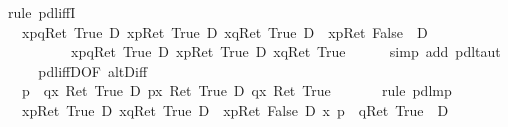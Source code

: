 \begin{isabellebody}
\isamarkupfalse%
\ {\isacharparenleft}rule\ pdl{\isacharunderscore}iffI{\isacharparenright}\isanewline
\ \ \isamarkupfalse%
\ {\isachardoublequote}{\isasymturnstile}\ {\isacharparenleft}\ {\isasymlangle}x{\isasymleftarrow}p{\isasymparallel}q{\isasymrangle}{\isacharparenleft}Ret\ True{\isacharparenright}\ {\isasymlongrightarrow}\isactrlsub D\ {\isasymlangle}x{\isasymleftarrow}p{\isasymrangle}{\isacharparenleft}Ret\ True{\isacharparenright}\ {\isasymor}\isactrlsub D\ {\isasymlangle}x{\isasymleftarrow}q{\isasymrangle}{\isacharparenleft}Ret\ True{\isacharparenright}\ {\isasymand}\isactrlsub D\ {\isacharbrackleft}{\isacharhash}\ x{\isasymleftarrow}p{\isacharbrackright}{\isacharparenleft}Ret\ False{\isacharparenright}\ {\isacharparenright}\ {\isasymlongrightarrow}\isactrlsub D\ \isanewline
\ \ \ \ \ \ \ \ \ \ {\isasymlangle}x{\isasymleftarrow}p{\isasymparallel}q{\isasymrangle}{\isacharparenleft}Ret\ True{\isacharparenright}\ {\isasymlongrightarrow}\isactrlsub D\ {\isasymlangle}x{\isasymleftarrow}p{\isasymrangle}{\isacharparenleft}Ret\ True{\isacharparenright}\ {\isasymor}\isactrlsub D\ {\isasymlangle}x{\isasymleftarrow}q{\isasymrangle}{\isacharparenleft}Ret\ True{\isacharparenright}{\isachardoublequote}\isanewline
\ \ \ \ \isamarkupfalse%
\ {\isacharparenleft}simp\ add{\isacharcolon}\ pdl{\isacharunderscore}taut{\isacharparenright}\isanewline
\ \ \isamarkupfalse%
\ \isamarkupfalse%
\ pdl{\isacharunderscore}iffD{}{\isacharbrackleft}OF\ altD{\isacharunderscore}iff{\isacharbrackright}\isanewline
\ \ \isamarkupfalse%
\ \isamarkupfalse%
\ \ {\isachardoublequote}{\isasymturnstile}\ {\isasymlangle}p\ {\isasymparallel}\ q{\isasymrangle}{\isacharparenleft}{\isasymlambda}x{\isachardot}\ Ret\ True{\isacharparenright}\ {\isasymlongrightarrow}\isactrlsub D\ {\isasymlangle}p{\isasymrangle}{\isacharparenleft}{\isasymlambda}x{\isachardot}\ Ret\ True{\isacharparenright}\ {\isasymor}\isactrlsub D\ {\isasymlangle}q{\isasymrangle}{\isacharparenleft}{\isasymlambda}x{\isachardot}\ Ret\ True{\isacharparenright}{\isachardoublequote}\ \isanewline
\ \ \ \ \isamarkupfalse%
\ {\isacharparenleft}rule\ pdl{\isacharunderscore}mp{\isacharparenright}\isanewline
\isamarkupfalse%
\isanewline
\ \ \isamarkupfalse%
\ {\isachardoublequote}{\isasymturnstile}\ {\isacharparenleft}\ {\isasymlangle}x{\isasymleftarrow}p{\isasymrangle}{\isacharparenleft}Ret\ True{\isacharparenright}\ {\isasymor}\isactrlsub D\ {\isasymlangle}x{\isasymleftarrow}q{\isasymrangle}{\isacharparenleft}Ret\ True{\isacharparenright}\ {\isasymand}\isactrlsub D\ {\isacharbrackleft}{\isacharhash}\ x{\isasymleftarrow}p{\isacharbrackright}{\isacharparenleft}Ret\ False{\isacharparenright}\ {\isasymlongrightarrow}\isactrlsub D\ {\isasymlangle}x{\isasymleftarrow}\ p\ {\isasymparallel}\ q{\isasymrangle}{\isacharparenleft}Ret\ True{\isacharparenright}\ {\isacharparenright}\ {\isasymlongrightarrow}\isactrlsub D\ \isanewline

\end{isabellebody}
